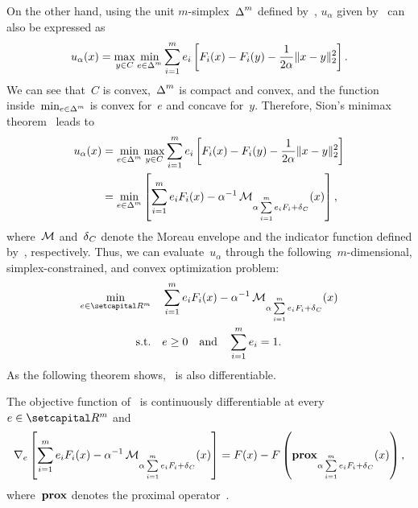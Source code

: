 \documentclass[../../main]{subfiles}
\begin{document}
On the other hand, using the unit $m$-simplex~$\operatorname{\Delta}^m$ defined by~, $u_\alpha$ given by~ can also be expressed as
\begin{equation}
    u_\alpha(x) = \max_{y \in C} \min_{e \in \operatorname{\Delta}^m} \sum_{i = 1}^{m} e_i \left[ F_i(x) - F_i(y) - \frac{1}{2 \alpha} \lVert x - y\rVert_2^2 \right] 
.\end{equation} 
We can see that~$C$ is convex,~$\operatorname{\Delta}^m$ is compact and convex, and the function inside~$\min_{e \in \operatorname{\Delta}^m}$ is convex for~$e$ and concave for~$y$.
Therefore, Sion's minimax theorem~\cite{Sion1958} leads to
\begin{equation} \label{eq:u dual}
    \begin{split}
        u_\alpha(x) &= \min_{e \in \operatorname{\Delta}^m} \max_{y \in C} \sum_{i = 1}^{m} e_i \left[ F_i(x) - F_i(y) - \frac{1}{2 \alpha} \lVert x - y\rVert_2^2 \right] \\
                  &= \min_{e \in \operatorname{\Delta}^m} \left[ \sum_{i = 1}^{m} e_i F_i(x) - \alpha^{-1} \operatorname{\mathcal{M}}_{\alpha \sum\limits_{i = 1}^{m} e_i F_i + \operatorname{\delta}_C} (x) \right]
    ,\end{split}
\end{equation}
where~$\operatorname{\mathcal{M}}$ and~$\operatorname{\delta}_C$ denote the Moreau envelope and the indicator function defined by~, respectively.
Thus, we can evaluate~$u_\alpha$ through the following~$m$-dimensional, simplex-constrained, and convex optimization problem:
\begin{equation} \label{eq:dual_reg_gap}
    \begin{aligned}
        \min_{e \in \setR^m} &&& \sum_{i = 1}^{m} e_i F_i(x) - \alpha^{-1} \envelope_{\alpha \sum\limits_{i = 1}^{m} e_i F_i + \indicator_C}(x) \\
        \st &&& e \ge 0 \eqand \sum_{i = 1}^{m} e_i = 1 
    .\end{aligned}
\end{equation} 
As the following theorem shows,~ is also differentiable.
\begin{theorem} 
    The objective function of~ is continuously differentiable at every~$e \in \setR^m$ and
    \begin{equation}
        \nabla_e \left[ \sum_{i = 1}^{m} e_i F_i(x) - \alpha^{-1} \operatorname{\mathcal{M}}_{\alpha \sum\limits_{i = 1}^{m} e_i F_i + \operatorname{\delta}_C}(x) \right] = F(x) - F\left( \operatorname{\mathbf{prox}}_{\alpha \sum\limits_{i = 1}^{m} e_i F_i + \operatorname{\delta}_C}(x) \right)
    ,\end{equation} 
    where~$\operatorname{\mathbf{prox}}$ denotes the proximal operator~.
\end{theorem}
\end{document}
